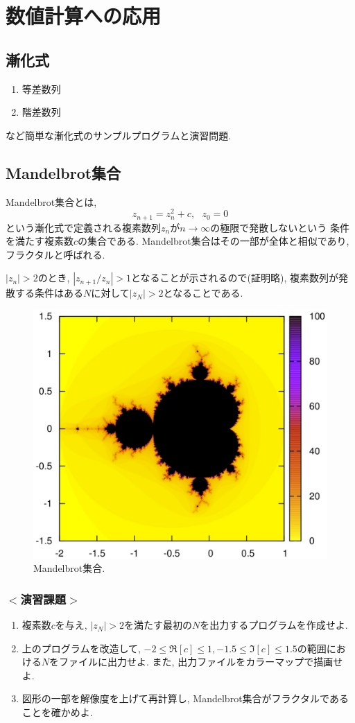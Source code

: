 \documentclass[a4j]{jsbook}
\begin{document}
\chapter{数値計算への応用}
\section{漸化式}
\begin{enumerate}
\item 等差数列
\item 階差数列
\end{enumerate}
など簡単な漸化式のサンプルプログラムと演習問題. 

\section{Mandelbrot集合}
Mandelbrot集合とは, 
\begin{equation}
z_{n+1}=z_n^2+c, \ \ \ z_0=0
\end{equation}
という漸化式で定義される複素数列$z_n$が$n \to \infty$の極限で発散しないという
条件を満たす複素数$c$の集合である. 
Mandelbrot集合はその一部が全体と相似であり, フラクタルと呼ばれる. 

$|z_n|>2$のとき, $|z_{n+1}/z_n|>1$となることが示されるので(証明略), 
複素数列が発散する条件はある$N$に対して$|z_N|>2$となることである. 

\begin{figure}[ht]
\centering
\includegraphics[width=0.75\linewidth]{source/figure/mandel.eps}
\caption{Mandelbrot集合. }
\end{figure}

\subsection*{$<$演習課題$>$}
\begin{enumerate}
\item 複素数$c$を与え, $|z_N|>2$を満たす最初の$N$を出力するプログラムを作成せよ. 
\item 上のプログラムを改造して, $-2 \le \Re[c] \le 1, -1.5 \le \Im[c] \le 1.5$の範囲における$N$をファイルに出力せよ. 
また, 出力ファイルをカラーマップで描画せよ. 
\item 図形の一部を解像度を上げて再計算し, Mandelbrot集合がフラクタルであることを確かめよ. 
\end{enumerate}
\end{document}
